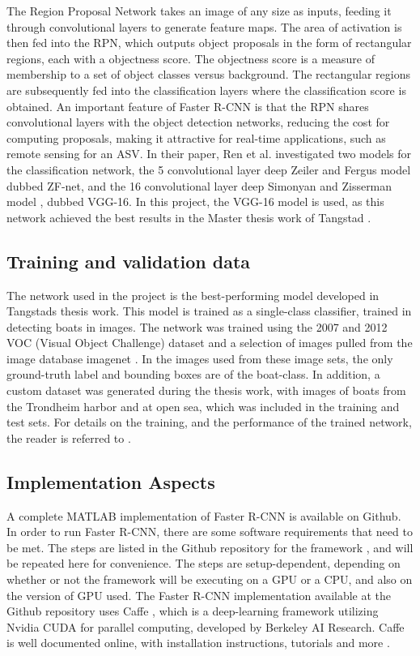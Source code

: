 The Region Proposal Network takes an image of any size as inputs, feeding it through convolutional layers to generate feature maps. The area of activation is then fed into the RPN, which outputs object proposals in the form of rectangular regions, each with a objectness score. The objectness score is a measure of membership to a set of object classes versus background. The rectangular regions are subsequently fed into the classification layers where the classification score is obtained. An important feature of Faster R-CNN is that the RPN shares convolutional layers with the object detection networks, reducing the cost for computing proposals, making it attractive for real-time applications, such as remote sensing for an ASV. In their paper, Ren et al. investigated two models for the classification network, the 5 convolutional layer deep Zeiler and Fergus model \cite{Zeiler2014} dubbed ZF-net, and the 16 convolutional layer deep Simonyan and Zisserman model \cite{VGG16}, dubbed VGG-16. In this project, the VGG-16 model is used, as this network achieved the best results in the Master thesis work of Tangstad \cite{tangstad}. 
\subsection{Training and validation data}
The network used in the project is the best-performing model developed in Tangstads thesis work. This model is trained as a single-class classifier, trained in detecting boats in images. The network was trained using the 2007 and 2012 VOC (Visual Object Challenge) \cite{voc} dataset and a selection of images pulled from the image database imagenet \cite{imagenet_cvpr09}. In the images used from these image sets, the only ground-truth label and bounding boxes are of the boat-class. In addition, a custom dataset was generated during the thesis work, with images of boats from the Trondheim harbor and at open sea, which was included in the training and test sets. For details on the training, and the performance of the trained network, the reader is referred to  \cite{tangstad}.
\subsection{Implementation Aspects}
A complete MATLAB implementation of Faster R-CNN is available on Github. In order to run Faster R-CNN, there are some software requirements that need to be met. The steps are listed in the Github repository for the framework \cite{faster_rcnn_git}, and will be repeated here for convenience. The steps are setup-dependent, depending on whether or not the framework will be executing on a GPU or a CPU, and also on the version of GPU used. The Faster R-CNN implementation available at the Github repository uses Caffe \cite{jia2014caffe}, which is a deep-learning framework utilizing Nvidia CUDA for parallel computing, developed by Berkeley AI Research. Caffe is well documented online, with installation instructions, tutorials and more \cite{caffe}. 

